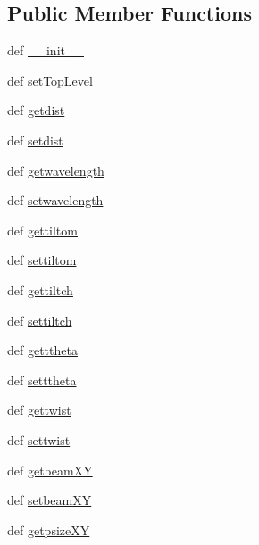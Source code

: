 \subsection*{Public Member Functions}
\begin{DoxyCompactItemize}
\item 
def \hyperlink{classmy_detector_1_1my_detector_a783da80204b3f19403a26284d376fc18}{\-\_\-\-\_\-init\-\_\-\-\_\-}
\item 
def \hyperlink{classmy_detector_1_1my_detector_ad1237b8f9843336bd470eea90068c001}{set\-Top\-Level}
\item 
def \hyperlink{classmy_detector_1_1my_detector_aa9ba5cd92fa49b0935c8cc5a88adf919}{getdist}
\item 
def \hyperlink{classmy_detector_1_1my_detector_a9dbec7a26b92a1d52144dd9fd99e89a7}{setdist}
\item 
def \hyperlink{classmy_detector_1_1my_detector_a73d637fe6d8f0b6685c9ea07e0444b14}{getwavelength}
\item 
def \hyperlink{classmy_detector_1_1my_detector_aa86114f3da1a2f6bf4d8595564654b0c}{setwavelength}
\item 
def \hyperlink{classmy_detector_1_1my_detector_aa70f5dd1888bee1c70eaa1a1410c4cd9}{gettiltom}
\item 
def \hyperlink{classmy_detector_1_1my_detector_a2ab94c7245903209b1ec67fe726727f8}{settiltom}
\item 
def \hyperlink{classmy_detector_1_1my_detector_a5814f9b4c3659e0c3ca527d2c62d0cb5}{gettiltch}
\item 
def \hyperlink{classmy_detector_1_1my_detector_a962ed549d7586e474ad70f18b16ee828}{settiltch}
\item 
def \hyperlink{classmy_detector_1_1my_detector_ae355ac64795c27bec293a55ea1f0f1c5}{getttheta}
\item 
def \hyperlink{classmy_detector_1_1my_detector_a820154c642e5b92a5b7a71d02f0611cd}{setttheta}
\item 
def \hyperlink{classmy_detector_1_1my_detector_af9f5fe17290771ee89f44d61460788c2}{gettwist}
\item 
def \hyperlink{classmy_detector_1_1my_detector_aa347097de35029fb149193660848637f}{settwist}
\item 
def \hyperlink{classmy_detector_1_1my_detector_a77ca154ee209ba6feea760224b0ccc7f}{getbeam\-X\-Y}
\item 
def \hyperlink{classmy_detector_1_1my_detector_a39df1d613aada63ef323aa4a5ca4fa34}{setbeam\-X\-Y}
\item 
def \hyperlink{classmy_detector_1_1my_detector_a9c607c43c8f55baa0c6bd7bf356b17a1}{getpsize\-X\-Y}

\end{DoxyCompactItemize}
